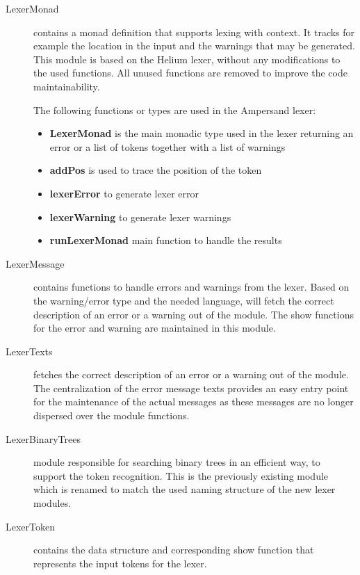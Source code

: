  \begin{description}
 
    \item[LexerMonad] contains a monad definition that supports lexing with context.
      It tracks for example the location in the input and the warnings that may be generated.
      This module is based on the Helium lexer, without any modifications to the used functions.
      All unused functions are removed to improve the code maintainability.
      
      The following functions or types are used in the Ampersand lexer:
	  \begin{itemize}
		\item \textbf{LexerMonad} is the main monadic type used in the lexer returning an error or a list of tokens together with a list of warnings
		\item \textbf{addPos} is used to trace the position of the token
		\item \textbf{lexerError} to generate lexer error
		\item \textbf{lexerWarning} to generate lexer warnings
		\item \textbf{runLexerMonad} main function to handle the  results 
	  \end{itemize}
	  
    \item[LexerMessage] contains functions to handle errors and warnings from the lexer.
	  Based on the warning/error type and the needed language,  will fetch the correct description of an error or a warning out of the  module.
	  The show functions for the error and warning are maintained in this module.
	  
    \item[LexerTexts] fetches the correct description of an error or a warning out of the  module.
	  The centralization of the error message texts provides an easy entry point for the maintenance of the actual messages as these messages are no longer dispersed over the module functions.
	  
    \item[LexerBinaryTrees] module responsible for searching binary trees in an efficient way, to support the token recognition.
    This is the previously existing  module which is renamed to match the used naming structure of the new lexer modules.

    \item[LexerToken] contains the data structure and corresponding show function that represents the input tokens for the lexer.
	
  \end{description}



